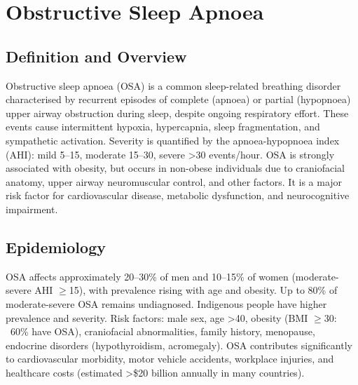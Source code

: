 \chapter{Obstructive Sleep Apnoea}

\section*{Definition and Overview}
Obstructive sleep apnoea (OSA) is a common sleep-related breathing disorder characterised by recurrent episodes of complete (apnoea) or partial (hypopnoea) upper airway obstruction during sleep, despite ongoing respiratory effort. These events cause intermittent hypoxia, hypercapnia, sleep fragmentation, and sympathetic activation. Severity is quantified by the apnoea-hypopnoea index (AHI): mild 5--15, moderate 15--30, severe >30 events/hour. OSA is strongly associated with obesity, but occurs in non-obese individuals due to craniofacial anatomy, upper airway neuromuscular control, and other factors. It is a major risk factor for cardiovascular disease, metabolic dysfunction, and neurocognitive impairment.

\section*{Epidemiology}
OSA affects approximately 20--30\% of men and 10--15\% of women (moderate-severe AHI $\ge$15), with prevalence rising with age and obesity. Up to 80\% of moderate-severe OSA remains undiagnosed. Indigenous people have higher prevalence and severity. Risk factors: male sex, age >40, obesity (BMI $\ge$30: ~60\% have OSA), craniofacial abnormalities, family history, menopause, endocrine disorders (hypothyroidism, acromegaly). OSA contributes significantly to cardiovascular morbidity, motor vehicle accidents, workplace injuries, and healthcare costs (estimated >\$20 billion annually in many countries).

